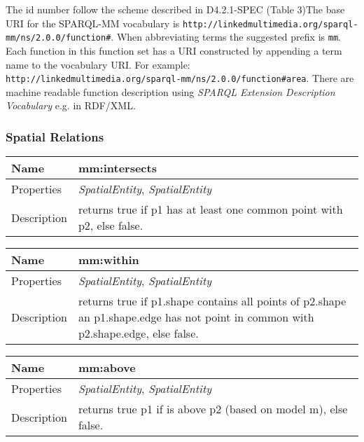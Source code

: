 The id number follow the scheme described in D4.2.1-SPEC (Table 3)The base URI for the SPARQL-MM vocabulary is
\texttt{http://linkedmultimedia.org/sparql-mm/ns/2.0.0/function#}.
When abbreviating terms the suggested prefix is \texttt{mm}.
Each function in this function set has a URI constructed by appending a term name to the vocabulary URI. For example:
\texttt{http://linkedmultimedia.org/sparql-mm/ns/2.0.0/function#area}.
There are machine readable function description using \textit{SPARQL Extension Description Vocabulary} e.g. in RDF/XML.
%
\subsubsection*{Spatial Relations}
\begin{tabular}{|p{3cm}|p{10cm}|}
\hline Name & mm:intersects\\
\hline Properties & \textit{SpatialEntity}, \textit{SpatialEntity} \\
\hline Description & returns true if p1 has at least one common point with p2, else false.\\
\hline
\end{tabular}
\vspace{0.3cm}
\newline
\begin{tabular}{|p{3cm}|p{10cm}|}
\hline Name & mm:within\\
\hline Properties & \textit{SpatialEntity}, \textit{SpatialEntity} \\
\hline Description & returns true if p1.shape contains all points of p2.shape an p1.shape.edge has not point in common with p2.shape.edge, else false.\\
\hline
\end{tabular}
\vspace{0.3cm}
\newline
\begin{tabular}{|p{3cm}|p{10cm}|}
\hline Name & mm:above\\
\hline Properties & \textit{SpatialEntity}, \textit{SpatialEntity} \\
\hline Description & returns true p1 if is above p2 (based on model m), else false.\\
\hline
\end{tabular}
\vspace{0.3cm}
\newline
